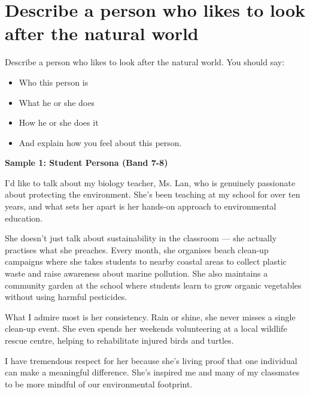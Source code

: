 \section{Describe a person who likes to look after the natural world}
\begin{ieltsprompt}
Describe a person who likes to look after the natural world.
You should say:
\begin{itemize}[leftmargin=2em, itemsep=2pt]
\item Who this person is
\item What he or she does
\item How he or she does it
\item And explain how you feel about this person.
\end{itemize}
\end{ieltsprompt}
\begin{ieltsanswer}
\textbf{Sample 1: Student Persona (Band 7-8)}

I'd like to talk about my biology teacher, Ms. Lan, who is genuinely passionate about protecting the environment. She's been teaching at my school for over ten years, and what sets her apart is her hands-on approach to environmental education.

She doesn't just talk about sustainability in the classroom — she actually practises what she preaches. Every month, she organises beach clean-up campaigns where she takes students to nearby coastal areas to collect plastic waste and raise awareness about marine pollution. She also maintains a community garden at the school where students learn to grow organic vegetables without using harmful pesticides.

What I admire most is her consistency. Rain or shine, she never misses a single clean-up event. She even spends her weekends volunteering at a local wildlife rescue centre, helping to rehabilitate injured birds and turtles.

I have tremendous respect for her because she's living proof that one individual can make a meaningful difference. She's inspired me and many of my classmates to be more mindful of our environmental footprint.
\end{ieltsanswer}


